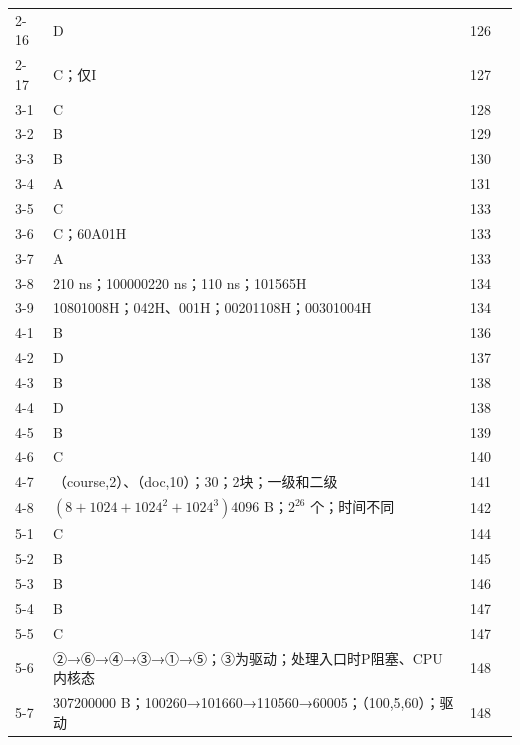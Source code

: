 \documentclass{sidenotes-simplex}
\begin{document}
{\begin{longtable}{@{}p{18mm}p{87mm}p{20mm}p{20mm}@{}}
2-16 & D & 126 & \hyperref[a:OS02-E16]{\pageref*{a:OS02-E16}} \\
2-17 & C；仅\ensuremath{\mathrm{I}} & 127 & \hyperref[a:OS02-E17]{\pageref*{a:OS02-E17}} \\
3-1 & C & 128 & \hyperref[a:OS03-E01]{\pageref*{a:OS03-E01}} \\
3-2 & B & 129 & \hyperref[a:OS03-E02]{\pageref*{a:OS03-E02}} \\
3-3 & B & 130 & \hyperref[a:OS03-E03]{\pageref*{a:OS03-E03}} \\
3-4 & A & 131 & \hyperref[a:OS03-E04]{\pageref*{a:OS03-E04}} \\
3-5 & C & 133 & \hyperref[a:OS03-E05]{\pageref*{a:OS03-E05}} \\
3-6 & C；60A01H & 133 & \hyperref[a:OS03-E06]{\pageref*{a:OS03-E06}} \\
3-7 & A & 133 & \hyperref[a:OS03-E07]{\pageref*{a:OS03-E07}} \\
3-8 & 210 ns；100000220 ns；110 ns；101565H & 134 & \hyperref[a:OS03-E08]{\pageref*{a:OS03-E08}} \\
3-9 & 10801008H；042H、001H；00201108H；00301004H & 134 & \hyperref[a:OS03-E09]{\pageref*{a:OS03-E09}} \\
4-1 & B & 136 & \hyperref[a:OS04-E01]{\pageref*{a:OS04-E01}} \\
4-2 & D & 137 & \hyperref[a:OS04-E02]{\pageref*{a:OS04-E02}} \\
4-3 & B & 138 & \hyperref[a:OS04-E03]{\pageref*{a:OS04-E03}} \\
4-4 & D & 138 & \hyperref[a:OS04-E04]{\pageref*{a:OS04-E04}} \\
4-5 & B & 139 & \hyperref[a:OS04-E05]{\pageref*{a:OS04-E05}} \\
4-6 & C & 140 & \hyperref[a:OS04-E06]{\pageref*{a:OS04-E06}} \\
4-7 & （course,2）、（doc,10）；30；2块；一级和二级 & 141 & \hyperref[a:OS04-E07]{\pageref*{a:OS04-E07}} \\
4-8 & \((8+1024+1024^2+1024^3)4096\) B；\(2^{26}\) 个；时间不同 & 142 & \hyperref[a:OS04-E08]{\pageref*{a:OS04-E08}} \\
5-1 & C & 144 & \hyperref[a:OS05-E01]{\pageref*{a:OS05-E01}} \\
5-2 & B & 145 & \hyperref[a:OS05-E02]{\pageref*{a:OS05-E02}} \\
5-3 & B & 146 & \hyperref[a:OS05-E03]{\pageref*{a:OS05-E03}} \\
5-4 & B & 147 & \hyperref[a:OS05-E04]{\pageref*{a:OS05-E04}} \\
5-5 & C & 147 & \hyperref[a:OS05-E05]{\pageref*{a:OS05-E05}} \\
5-6 & {\SNsymbolfont ②}→{\SNsymbolfont ⑥}→{\SNsymbolfont ④}→{\SNsymbolfont ③}→{\SNsymbolfont ①}→{\SNsymbolfont ⑤}；{\SNsymbolfont ③}为驱动；处理入口时P阻塞、CPU内核态 & 148 & \hyperref[a:OS05-E06]{\pageref*{a:OS05-E06}} \\
5-7 & 307200000 B；100260→101660→110560→60005；（100,5,60）；驱动 & 148 & \hyperref[a:OS05-E07]{\pageref*{a:OS05-E07}} \\
\end{longtable}}
\end{document}
